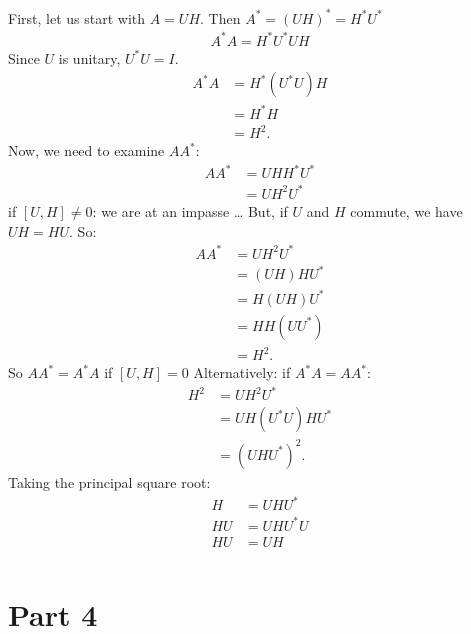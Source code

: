 \documentclass{article}
\begin{document}
First, let us start with $A = UH$. Then $A^* = (UH)^* = H^* U^*$
\begin{align*} A^* A = H^* U^* U H \end{align*}
Since $U$ is unitary, $U^* U = I$.
\begin{align*}
    A^* A &= H^* (U^* U) H \\
    &= H^* H \\
    &= H^2.
\end{align*}
Now, we need to examine $A A^*$:
\begin{align*}
    A A^* & = U H H^* U^* \\
    & = U H^2 U^*
\end{align*}
if $[U, H] \ne 0$: we are at an impasse \dots
But, if $U$ and $H$ commute, we have $UH = HU$. So:
\begin{align*}
    A A^* &= U H^2 U^*\\
    &= (U H) H U^*\\
    &= H (U H) U^*\\
    &= H H (U U^*)\\
    &= H^2.
\end{align*}
So $A A^* = A^* A$ if $[U, H] = 0$
Alternatively: if $A^* A = A A^*$:
\begin{align*}
    H^2 &= U H^2 U^*\\
    &= U H (U^* U) H U^*\\
    &= (U H U^*)^2.
\end{align*}
Taking the principal square root:
\begin{align*}
    H &= U H U^* \\
    H U &= U H U^* U \\
    H U &= U H \\
\end{align*}

\newpage
\section{Part 4}
\end{document}
